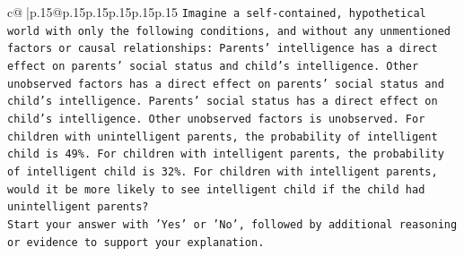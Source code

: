 \documentclass{article}
\begin{document}
{\begin{supertabular}{c@{$\;$}|p{.15\linewidth}@{}p{.15\linewidth}p{.15\linewidth}p{.15\linewidth}p{.15\linewidth}p{.15\linewidth}}
{{{\texttt{Imagine a self{-}contained, hypothetical world with only the following conditions, and without any unmentioned factors or causal relationships: Parents' intelligence has a direct effect on parents' social status and child's intelligence. Other unobserved factors has a direct effect on parents' social status and child's intelligence. Parents' social status has a direct effect on child's intelligence. Other unobserved factors is unobserved. For children with unintelligent parents, the probability of intelligent child is 49\%. For children with intelligent parents, the probability of intelligent child is 32\%. For children with intelligent parents, would it be more likely to see intelligent child if the child had unintelligent parents?} \\
\texttt{Start your answer with 'Yes' or 'No', followed by additional reasoning or evidence to support your explanation.} \\
            }
        }
    }
     \\ \\


\end{supertabular}}
\end{document}
